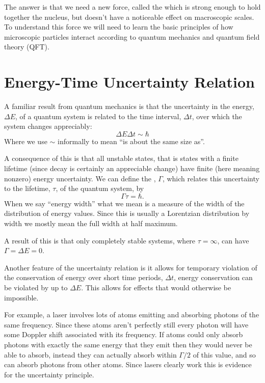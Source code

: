 \documentclass[fleqn]{NotesClass}
\begin{document}
    The answer is that we need a new force, called the  which is strong enough to hold together the nucleus, but doesn't have a noticeable effect on macroscopic scales.
    To understand this force we will need to learn the basic principles of how microscopic particles interact according to quantum mechanics and quantum field theory (QFT).
    
    \section{Energy-Time Uncertainty Relation}
    A familiar result from quantum mechanics is that the uncertainty in the energy, \(\Delta E\), of a quantum system is related to the time interval, \(\Delta t\), over which the system changes appreciably:
    \begin{equation}
        \Delta E \Delta t \sim \hbar
    \end{equation}
    Where we use \(\sim\) informally to mean \enquote{is about the same size as}.
    
    A consequence of this is that all unstable states, that is states with a finite lifetime (since decay is certainly an appreciable change) have finite (here meaning nonzero) energy uncertainty.
    We can define the , \(\Gamma\), which relates this uncertainty to the lifetime, \(\tau\), of the quantum system, by
    \begin{equation}
        \Gamma\tau = \hbar.
    \end{equation}
    When we say \enquote{energy width} what we mean is a measure of the width of the distribution of energy values.
    Since this is usually a Lorentzian distribution by width we mostly mean the full width at half maximum.
    
    A result of this is that only completely stable systems, where \(\tau = \infty\), can have \(\Gamma = \Delta E = 0\).
    
    Another feature of the uncertainty relation is it allows for temporary violation of the conservation of energy over short time periods, \(\Delta t\), energy conservation can be violated by up to \(\Delta E\).
    This allows for effects that would otherwise be impossible.
    
    For example, a laser involves lots of atoms emitting and absorbing photons of the same frequency.
    Since these atoms aren't perfectly still every photon will have some Doppler shift associated with its frequency.
    If atoms could only absorb photons with exactly the same energy that they emit then they would never be able to absorb, instead they can actually absorb within \(\Gamma/2\) of this value, and so can absorb photons from other atoms.
    Since lasers clearly work this is evidence for the uncertainty principle.
    
\end{document}
